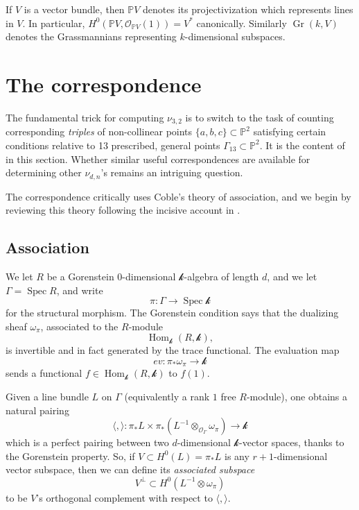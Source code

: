 \documentclass[reqno, 11pt]{amsart}
\theoremstyle{plain}
\theoremstyle{remark}
\renewcommand{\P}{\mathbb{P}}
\renewcommand{\k}{\mathscr{k}}
\DeclareMathOperator{\Spec}{Spec }
\DeclareMathOperator{\Hom}{Hom}
\renewcommand{\O}{\mathcal{O}}
\DeclareMathOperator{\Gr}{Gr}
\begin{document}
If $V$ is a vector bundle, then $\P V$ denotes its projectivization which represents lines in $V$.  In particular, $H^{0}(\P V, \O_{\P V}(1)) = V^{*}$ canonically.  Similarly $\Gr(k,V)$ denotes the Grassmannians representing $k$-dimensional subspaces.


\section{The correspondence}
\label{sec:translation}

The fundamental trick for computing $\nu_{3,2}$ is to switch to the task of counting corresponding {\sl triples} of
non-collinear points $\{a,b,c\} \subset \P^2$ satisfying certain conditions
relative to 13 prescribed, general points $\Gamma_{13} \subset \P^2$.  It is the content of  in this section.  Whether
 similar useful correspondences are available for determining other $\nu_{d,n}$'s remains an intriguing question.  
 
 The correspondence critically uses Coble's theory of association, and we begin by
reviewing this theory following the incisive account in \cite{EISENBUD2000127}.  

\subsection{Association}
\label{sec:association}


We let $R$ be a Gorenstein $0$-dimensional $\k$-algebra of length $d$,
and we let $\Gamma = \Spec R$, and write \[\pi: \Gamma \to \Spec \k\] for
the structural morphism.  The Gorenstein condition says that the dualizing sheaf $\omega_{\pi}$,
associated to the $R$-module
\[ \Hom_{\k}(R,\k),\] is invertible and in fact generated by the trace
functional. The evaluation map
\[ev: \pi_{*}\omega_{\pi} \to \k\] sends a functional 
$f \in \Hom_{\k}(R,\k)$ to $f(1)$.

Given a line bundle $L$ on $\Gamma$ (equivalently a rank $1$
free $R$-module), one obtains a natural pairing
\[\langle, \rangle: \pi_{*}L \times 
  \pi_{*}\left( L^{-1} \otimes_{\O_{\Gamma}}
    \omega_{\pi}\right) \to \k \] which is a perfect pairing between
two $d$-dimensional $\k$-vector spaces, thanks to the Gorenstein
property.  So, if
$V \subset H^{0}(L) = \pi_{*}L$ is any
$r+1$-dimensional vector subspace,  then we can define its {\sl
  associated subspace}
\[V^{\perp} \subset H^{0}(L^{-1}\otimes \omega_{\pi})\] to be $V$'s orthogonal complement with respect to $\langle, \rangle$.
\end{document}
